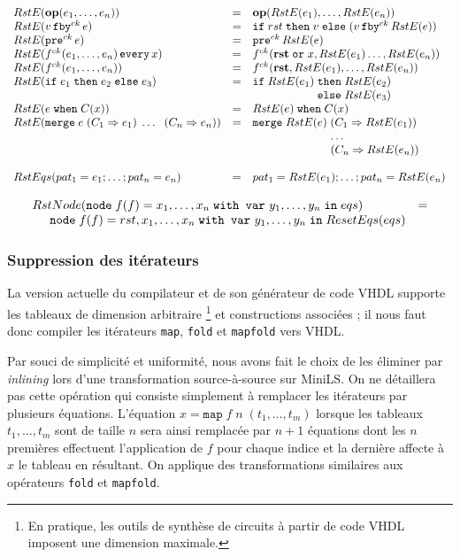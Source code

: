 \documentclass[a4paper]{article}
\newcommand{\mybox}[1]{\mbox{\tt{#1}}}
\newcommand{\ind}[0]{\hspace{0.5cm}}
\newcommand{\Node}[4]{\mybox{node} \; f(#1) = #2 \; \mybox{with var} \
  #3 \; \mybox{in} \; #4}
\newcommand{\Op}[2]{\mybox{\bf{op}}(#1,\dots,#2)}
\newcommand{\Fby}[2]{#1 \, \mybox{fby}^{ck} \, #2}
\newcommand{\Pre}[1]{\mybox{pre}^{ck} \, #1}
\newcommand{\Every}[4]{#1^{ck}(#2,\dots,#3) \, \mybox{every} \, #4}
\newcommand{\App}[2]{#1^{ck}(#2)}
\newcommand{\If}[3]{\mybox{if} \; #1 \; \mybox{then} \; #2 \; \mybox{else} \; #3}
\newcommand{\When}[3]{#1 \; \mybox{when} \; #2(#3)}
\newcommand{\Merge}[5]{\mybox{merge} \; #1 \; (#2 \Rightarrow #3) \; \dots \; \
  (#4 \Rightarrow #5)}
\newcommand{\Map}[3]{\mathtt{map} \; #1\; n\; (#2,\dots,#3)}
\begin{document}
\[
\begin{array}{lcl}
  \re{\Op{e_1}{e_n}} & = & \Op{\re{e_1}}{\re{e_n}} \\
  \re{\Fby{v}{e}} & = & \If{rst}{v}{(\Fby{v}{\re{e}})} \\
  \re{\Pre{e}} & = & \Pre{\re{e}} \\
  \re{\Every{f}{e_1}{e_n}{x}} & = & \App{f}{\mathbf{rst} \; \mathtt{or} \;
    x, \re{e_1} \dots, \re{e_n}} \\
  \re{\App{f}{e_1,\dots,e_n}} & = &
  \App{f}{\mathbf{rst},\re{e_1},\dots,\re{e_n}} \\
  \re{\If{e_1}{e_2}{e_3}} & = & \If{\re{e_1}}{\re{e_2}\\ & & \hspace{1.9cm}}
  {\re{e_3}} \\
  \re{\When{e}{C}{x}} & = & \When{\re{e}}{C}{x} \\
  \re{\Merge{e}{C_1}{e_1}{C_n}{e_n}} & = &
  \mybox{merge} \; \re{e} \; (C_1 \Rightarrow \re{e_1}) \\
  & & \hspace{2.4cm} \dots \\
  & & \hspace{2.4cm} (C_n \Rightarrow \re{e_n})
\\ \\
RstEqs(pat_1 = e_1;\dots;pat_n = e_n) & = &
  pat_1 = \re{e_1};\dots;pat_n = \re{e_n} \\
  \end{array}
\]

\[
\begin{array}{ll}
  \rstn{\Node{f}{x_1,\dots,x_n}{y_1,\dots,y_n}{eqs}} & = \\
  \ind \Node{f}{rst,x_1,\dots,x_n}{y_1,\dots,y_n}{ResetEqs(eqs)}
\end{array}
\]

\subsubsection{Suppression des it\'erateurs}

La version actuelle du compilateur et de son g\'en\'erateur de code VHDL supporte
les tableaux de dimension arbitraire \footnote{En pratique, les outils de
  synth\`ese de circuits \`a partir de code VHDL imposent une dimension maximale.}
et constructions associ\'ees ; il nous faut donc compiler les it\'erateurs
\texttt{map}, \texttt{fold} et \texttt{mapfold} vers VHDL.

Par souci de simplicit\'e et uniformit\'e, nous avons fait le choix de les \'eliminer
par \textit{inlining} lors d'une transformation source-\`a-source sur MiniLS. On
ne d\'etaillera pas cette op\'eration qui consiste simplement \`a remplacer les
it\'erateurs par plusieurs \'equations. L'\'equation $x = \Map{f}{t_1}{t_m}$ lorsque
les tableaux $t_1, \dots, t_m$ sont de taille $n$ sera ainsi remplac\'ee par $n +
1$ \'equations dont les $n$ premi\`eres effectuent l'application de $f$ pour chaque
indice et la derni\`ere affecte \`a $x$ le tableau en r\'esultant. On applique des
transformations similaires aux op\'erateurs \texttt{fold} et \texttt{mapfold}.
\end{document}
